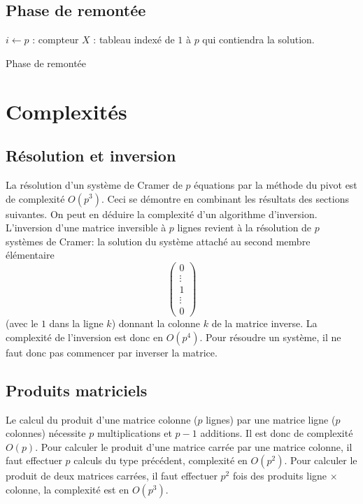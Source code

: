 \subsection{Phase de remontée}
\begin{algorithm}[h]
  $i\leftarrow p$ : compteur\;
  $X$ : tableau indexé de $1$ à $p$ qui contiendra la solution.\;
  \caption{Phase de remontée}
  \label{resolsystlin_3}
\end{algorithm}


\section{Complexités}
\subsection{Résolution et inversion}
La résolution d'un système de Cramer de $p$ équations par la méthode du pivot est de complexité $O(p^3)$.\newline
Ceci se démontre en combinant les résultats des sections suivantes. On peut en déduire la complexité d'un algorithme d'inversion.\newline
L'inversion d'une matrice inversible à $p$ lignes revient à la résolution de $p$ systèmes de Cramer: la solution du système attaché au second membre élémentaire
\begin{displaymath}
\begin{pmatrix}
0 \\ \vdots \\ 1 \\ \vdots \\0   
 \end{pmatrix}
\end{displaymath}
(avec le $1$ dans la ligne $k$) donnant la colonne $k$ de la matrice inverse. La complexité de l'inversion est donc en $O(p^4)$. Pour résoudre un système, il ne faut donc pas commencer par inverser la matrice.
\subsection{Produits matriciels}
Le calcul du produit d'une matrice colonne ($p$ lignes) par une matrice ligne ($p$ colonnes) nécessite $p$ multiplications et $p-1$ additions. Il est donc de complexité $O(p)$.\newline
Pour calculer le produit d'une matrice carrée par une matrice colonne, il faut effectuer $p$ calculs du type précédent, complexité en $O(p^2)$.\newline
Pour calculer le produit de deux matrices carrées, il faut effectuer $p^2$ fois des produits ligne $\times$ colonne, la complexité est en $O(p^3)$.
